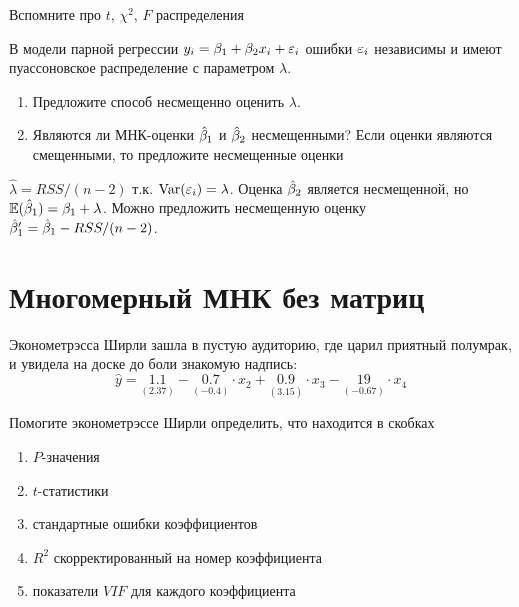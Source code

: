 \documentclass[pdftex,11pt,openany]{book}\usepackage[]{graphicx}\usepackage[]{color}
\begin{document}
\begin{solution}
Вспомните про $t$, $\chi^2$, $F$ распределения
\end{solution}


\begin{problem}
В модели парной регрессии $y_i=\beta_1+\beta_2 x_i +\varepsilon_i$ ошибки $\varepsilon_i$ независимы и имеют пуассоновское распределение с параметром $\lambda$.
\begin{enumerate}
\item Предложите способ несмещенно оценить $\lambda$.
\item Являются ли МНК-оценки $\hat{\beta}_1$ и $\hat{\beta}_2$ несмещенными? Если оценки являются смещенными, то предложите несмещенные оценки
\end{enumerate}
\end{problem}


\begin{solution}
$\hat{\lambda}=RSS/(n-2)$ т.к. $\operatorname{Var}(\varepsilon_i)=\lambda$. Оценка $\hat{\beta}_2$ является несмещенной, но $\mathbb{E}(\hat{\beta}_1)=\beta_1+\lambda$. Можно предложить несмещенную оценку $\hat{\beta}'_1=\hat{\beta}_1-RSS/(n-2)$.
\end{solution}




\chapter{Многомерный МНК без матриц}



\begin{problem}
 Эконометрэсса Ширли зашла в пустую аудиторию, где царил приятный полумрак, и увидела на доске до боли знакомую надпись:
\[
\hat{y}=\underset{(2.37)}{1.1}-\underset{(-0.4)}{0.7}\cdot x_2+\underset{(3.15)}{0.9}\cdot x_3-\underset{(-0.67)}{19}\cdot x_4
\]

Помогите эконометрэссе Ширли определить, что находится в скобках 
\begin{enumerate}
\item $P$-значения
\item $t$-статистики
\item стандартные ошибки коэффициентов
\item $R^2$ скорректированный на номер коэффициента
\item показатели $VIF$ для каждого коэффициента
\end{enumerate}
\end{problem}
\end{document}
